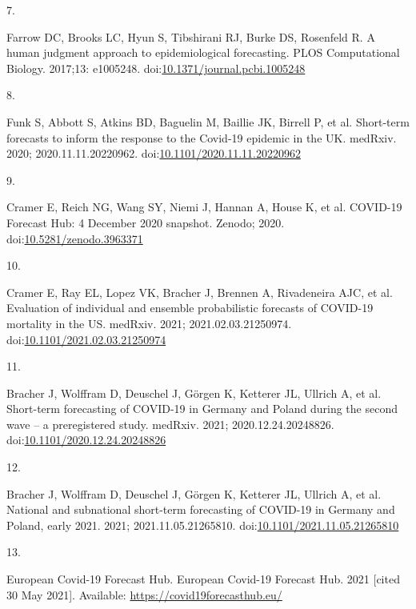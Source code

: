 \documentclass[10pt,letterpaper]{article}
\newlength{\cslhangindent}
\newlength{\csllabelwidth}
\newlength{\cslentryspacingunit} %
\newenvironment{CSLReferences}[2] %
 {%
  \setlength{\parindent}{0pt}
  \ifodd #1
  \let\oldpar\par
  \def\par{\hangindent=\cslhangindent\oldpar}
  \fi
  \setlength{\parskip}{#2\cslentryspacingunit}
 }%
 {}
\newcommand{\CSLLeftMargin}[1]{\parbox[t]{\csllabelwidth}{#1}}
\newcommand{\CSLRightInline}[1]{\parbox[t]{\linewidth - \csllabelwidth}{#1}\break}
\begin{document}
\begin{CSLReferences}{0}{0}
\leavevmode{}%
\CSLLeftMargin{7. }%
\CSLRightInline{Farrow DC, Brooks LC, Hyun S, Tibshirani RJ, Burke DS,
Rosenfeld R. A human judgment approach to epidemiological forecasting.
PLOS Computational Biology. 2017;13: e1005248.
doi:\href{https://doi.org/10.1371/journal.pcbi.1005248}{10.1371/journal.pcbi.1005248}}

\leavevmode{}%
\CSLLeftMargin{8. }%
\CSLRightInline{Funk S, Abbott S, Atkins BD, Baguelin M, Baillie JK,
Birrell P, et al. Short-term forecasts to inform the response to the
{Covid-19} epidemic in the {UK}. medRxiv. 2020; 2020.11.11.20220962.
doi:\href{https://doi.org/10.1101/2020.11.11.20220962}{10.1101/2020.11.11.20220962}}

\leavevmode{}%
\CSLLeftMargin{9. }%
\CSLRightInline{Cramer E, Reich NG, Wang SY, Niemi J, Hannan A, House K,
et al. {COVID-19 Forecast Hub}: 4 {December} 2020 snapshot. {Zenodo};
2020.
doi:\href{https://doi.org/10.5281/zenodo.3963371}{10.5281/zenodo.3963371}}

\leavevmode{}%
\CSLLeftMargin{10. }%
\CSLRightInline{Cramer E, Ray EL, Lopez VK, Bracher J, Brennen A,
Rivadeneira AJC, et al. Evaluation of individual and ensemble
probabilistic forecasts of {COVID-19} mortality in the {US}. medRxiv.
2021; 2021.02.03.21250974.
doi:\href{https://doi.org/10.1101/2021.02.03.21250974}{10.1101/2021.02.03.21250974}}

\leavevmode{}%
\CSLLeftMargin{11. }%
\CSLRightInline{Bracher J, Wolffram D, Deuschel J, Görgen K, Ketterer
JL, Ullrich A, et al. Short-term forecasting of {COVID-19} in {Germany}
and {Poland} during the second wave -- a preregistered study. medRxiv.
2021; 2020.12.24.20248826.
doi:\href{https://doi.org/10.1101/2020.12.24.20248826}{10.1101/2020.12.24.20248826}}

\leavevmode{}%
\CSLLeftMargin{12. }%
\CSLRightInline{Bracher J, Wolffram D, Deuschel J, Görgen K, Ketterer
JL, Ullrich A, et al. National and subnational short-term forecasting of
{COVID-19} in {Germany} and {Poland}, early 2021. 2021;
2021.11.05.21265810.
doi:\href{https://doi.org/10.1101/2021.11.05.21265810}{10.1101/2021.11.05.21265810}}

\leavevmode{}%
\CSLLeftMargin{13. }%
\CSLRightInline{European Covid-19 Forecast Hub. European {Covid-19
Forecast Hub}. 2021 {[}cited 30 May 2021{]}. Available:
\url{https://covid19forecasthub.eu/}}


\end{CSLReferences}
\end{document}
